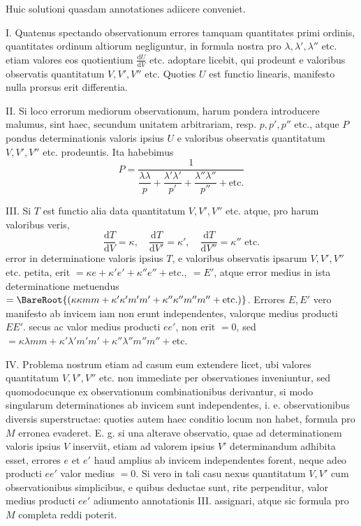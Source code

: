 \par
Huic solutioni quasdam annotationes adiicere conveniet.

I. Quatenus spectando observationum errores tamquam quantitates primi ordinis, quantitates ordinum altiorum negliguntur, in formula nostra pro \(\lambda,\lambda',\lambda''\) etc. etiam valores eos quotientium \(\frac{\mathrm{d}U}{\mathrm{d}V}\) etc. adoptare licebit, qui prodeunt e valoribus observatis quantitatum \(V,V',V''\) etc. Quoties \(U\) est functio linearis, manifesto nulla prorsus erit differentia.

II. Si loco errorum mediorum observationum, harum pondera introducere malumus, sint haec, secundum unitatem arbitrariam, resp. \(p,p',p''\) etc., atque \(P\) pondus determinationis valoris ipsius \(U\) e valoribus observatis quantitatum \(V,V',V''\) etc. prodeuntis. Ita habebimus
\[
P=\frac{1}{\dfrac{\lambda\lambda}{p}+\dfrac{\lambda'\lambda'}{p'}+\dfrac{\lambda''\lambda''}{p''}+\text{etc.}}
\]

III. Si \(T\) est functio alia data quantitatum \(V,V',V''\) etc. atque, pro harum valoribus veris,
\[
\frac{\mathrm{d}T}{\mathrm{d}V}=\kappa,\quad\frac{\mathrm{d}T}{\mathrm{d}V'}=\kappa',\quad\frac{\mathrm{d}T}{\mathrm{d}V''}=\kappa''\text{ etc.}
\]
error in determinatione valoris ipsius \(T\), e valoribus observatis ipsarum \(V,V',V''\) etc. petita, erit \(=\kappa e+\kappa'e'+\kappa''e''+\text{etc.},\ =E'\), atque error medius in ista determinatione metuendus \(=\BareRoot{(\kappa\kappa mm+\kappa'\kappa'm'm'+\kappa''\kappa''m''m''+\text{etc.})}\). Errores \(E,E'\) vero manifesto ab invicem iam non erunt independentes, valorque medius producti \(EE'\). secus ac valor medius producti \(ee'\), non erit \(=0\), sed \(=\kappa\lambda mm+\kappa'\lambda'm'm'+\kappa''\lambda''m''m''+\text{etc.}\)

IV. Problema nostrum etiam ad casum eum extendere licet, ubi valores quantitatum \(V,V',V''\) etc. non immediate per observationes inveniuntur, sed quomodocunque ex observationum combinationibus derivantur, si modo singularum determinationes ab invicem sunt independentes, i. e. observationibus diversis superstructae: quoties autem haec conditio locum non habet, formula pro \(M\) erronea evaderet. E. g. si una alterave observatio, quae ad determinationem valoris ipsius \(V\) inserviit, etiam ad valorem ipsius \(V'\) determinandum adhibita esset, errores \(e\) et \(e'\) haud amplius ab invicem independentes forent, neque adeo producti \(ee'\) valor medius \(=0\). Si vero in tali casu nexus quantitatum \(V,V'\) cum observationibus simplicibus, e quibus deductae sunt, rite perpenditur, valor medius producti \(ee'\) adiumento annotationis III. assignari, atque sic formula pro \(M\) completa reddi poterit.

